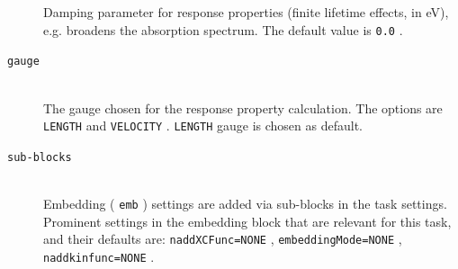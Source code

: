 \documentclass[bibliography=totocnumbered,a4paper,10pt,oneside]{scrbook}
\newcommand{\ttt}[1]{%
  \begingroup\setlength{\fboxsep}{1pt}%
  \colorbox{serenity-green!30}{\texttt{\hspace*{2pt}\vphantom{(g}#1\hspace*{2pt}}}%
  \endgroup
}
\begin{document}
\begin{description}
    Damping parameter for response properties (finite lifetime effects, in eV), e.g. broadens the absorption spectrum. The default value is \ttt{0.0}.
    \item [\texttt{gauge}]\hfill \\
    The gauge chosen for the response property calculation. The options are \ttt{LENGTH} and \ttt{VELOCITY}. \ttt{LENGTH} gauge is chosen as default.
    \item [\texttt{sub-blocks}]\hfill \\
        Embedding (\ttt{emb}) settings are added via sub-blocks in the task settings.
        Prominent settings in the embedding block that are relevant for this task, and their defaults are:
        \ttt{naddXCFunc=NONE}, \ttt{embeddingMode=NONE}, \ttt{naddkinfunc=NONE}.
\end{description}
\end{document}
